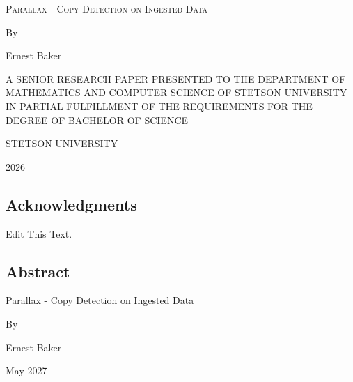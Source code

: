 \documentclass[12pt]{article}
\newcommand{\myTitle}{Parallax - Copy Detection on Ingested Data}
\newcommand{\myAuthor}{Ernest Baker}
\newcommand{\myPublicationYear}{2026}
\newcommand{\myGraduationDate}{May 2027}
\newcommand{\bigName}[1]{
   \begin{center}\fontfamily{phv}\selectfont\Huge\scshape#1\end{center}
}
\begin{document}
\bigName{\myTitle}

\vspace{2.25in}
\begin{centering}
By

\myAuthor

\vspace{2.25in}
\singlespacing
A SENIOR RESEARCH PAPER PRESENTED TO THE DEPARTMENT OF MATHEMATICS AND COMPUTER
SCIENCE OF STETSON UNIVERSITY IN PARTIAL FULFILLMENT OF THE REQUIREMENTS FOR THE
DEGREE OF BACHELOR OF SCIENCE
\singlespacing

\vspace{.5in}

STETSON UNIVERSITY

\myPublicationYear
\newpage

\setcounter{section}{0}
\subsection*{Acknowledgments}


\doublespacing
Edit This Text.
\doublespacing
\newpage
\tableofcontents

\newpage
\listoftables
%
\listoffigures

\newpage
\subsection*{Abstract}

\singlespacing
\myTitle

By

\myAuthor

\myGraduationDate

\end{centering}
\end{document}
